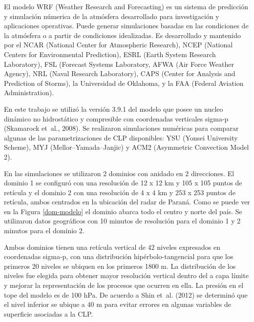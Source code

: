 \documentclass[12pt,spanish,oneside, a4paper]{book}
\begin{document}
El modelo WRF (Weather Research and Forecasting) es un sistema de
predicción y simulación númerica de la atmósfera desarrollado para
investigación y aplicaciones operativas. Puede generar simulaciones
basadas en las condiciones de la atmósfera o a partir de condiciones
idealizadas. Es desarrollado y mantenido por el NCAR (National Center
for Atmospheric Research), NCEP (National Centers for Environmental
Prediction), ESRL (Earth System Research Laboratory), FSL (Forecast
Systems Laboratory, AFWA (Air Force Weather Agency), NRL (Naval Research
Laboratory), CAPS (Center for Analysis and Prediction of Storms), la
Universidad de Oklahoma, y la FAA (Federal Aviation Administration).

En este trabajo se utilizó la versión 3.9.1 del modelo que posee un
nucleo dinámico no hidrostático y compresible con coordenadas verticales
sigma-p (Skamarock et~al., 2008). Se realizaron simulaciones numéricas
para comparar algunas de las parametrizaciones de CLP disponibles: YSU
(Yonsei University Scheme), MYJ (Mellor--Yamada--Janjic) y ACM2
(Asymmetric Convection Model 2).

En las simulaciones se utilizaron 2 dominios con anidado en 2
direcciones. El dominio 1 se configuró con una resolución de 12 x 12 km
y 105 x 105 puntos de retícula y el dominio 2 con una resolución de 4 x
4 km y 253 x 253 puntos de retícula, ambos centrados en la ubicación del
radar de Paraná. Como se puede ver en la Figura \ref{dom-modelo} el
dominio abarca todo el centro y norte del país. Se utilizaron datos
geográficos con 10 minutos de resolución para el dominio 1 y 2 minutos
para el dominio 2.

Ambos dominios tienen una retícula vertical de 42 niveles expresados en
coordenadas sigma-p, con una distribución hipérbolo-tangencial para que
los primeros 20 niveles se ubiquen en los primeros 1800 m. La
distribución de los niveles fue elegida para obtener mayor resolución
vertical dentro del a capa límite y mejorar la representación de los
procesos que ocurren en ella. La presión en el tope del modelo es de 100
hPa. De acuerdo a Shin et~al. (2012) se determinó que el nivel inferior
se ubique a 40 m para evitar errores en algunas variables de superficie
asociadas a la CLP.
\end{document}
